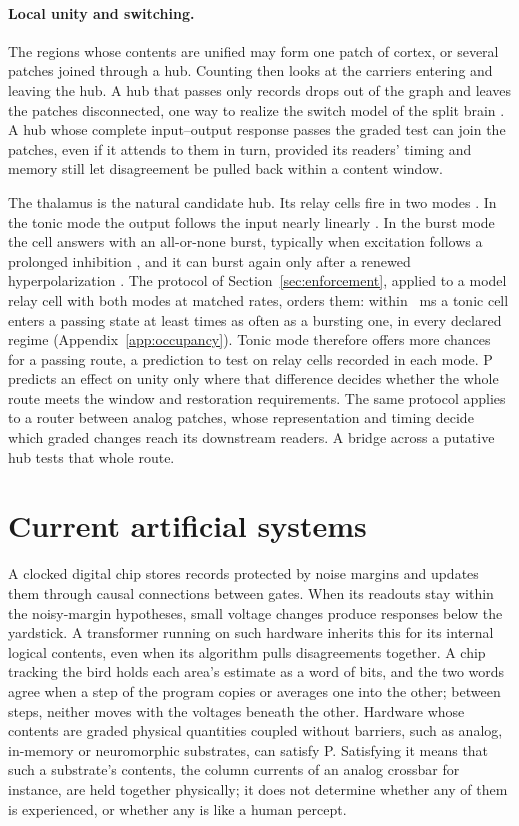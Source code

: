 \documentclass[12pt]{article}
\begin{document}
\paragraph{Local unity and switching.} The regions whose contents are unified
may form one patch of cortex, or several patches joined through a hub. Counting
then looks at the carriers entering and leaving the hub. A hub that passes only
records drops out of the graph and leaves the patches disconnected, one way to
realize the switch model of the split brain \citep{bayne2010}. A hub whose
complete input--output response passes the graded test can join the patches,
even if it attends to them in turn, provided its readers' timing and memory
still let disagreement be pulled back within a content window.

The thalamus is the natural candidate hub. Its relay cells fire in two modes
\citep{sherman2001}. In the tonic mode the output follows the input nearly
linearly \citep{lesica2004}. In the burst mode the cell answers with an
all-or-none burst, typically when excitation follows a prolonged inhibition
\citep{lesica2004}, and it can burst again only after a renewed hyperpolarization
\citep{sherman2001}. The protocol of Section~\ref{sec:enforcement}, applied to a
model relay cell with both modes \citep{smith2000} at matched rates, orders
them: within \uOccContentLongMs{}~ms a tonic cell enters a passing state at least
\uRlHitRatioMin{} times as often as a bursting one, in every declared regime
(Appendix~\ref{app:occupancy}). Tonic mode therefore offers more chances for a
passing route, a prediction to test on relay cells recorded in each mode. P
predicts an effect on unity only where that difference decides whether the
whole route meets the window and restoration requirements. The same protocol
applies to a router between analog patches, whose representation and timing
decide which graded changes reach its downstream readers. A bridge across a
putative hub tests that whole route.

\section{Current artificial systems}
\label{sec:ai}

A clocked digital chip stores records protected by noise margins and
updates them through causal connections between gates. When its readouts stay
within the noisy-margin hypotheses, small voltage changes produce responses
below the yardstick. A transformer running on such hardware inherits this for
its internal logical contents, even when its algorithm pulls disagreements
together. A chip tracking the bird holds each
area's estimate as a word of bits, and the two words agree when a step of the
program copies or averages one into the other; between steps, neither moves with
the voltages beneath the other. Hardware whose contents are graded physical
quantities coupled without barriers, such as analog, in-memory or neuromorphic
substrates, can satisfy P. Satisfying it means that such a substrate's contents,
the column currents of an analog crossbar for instance, are held together
physically; it does not determine whether any of them is experienced, or whether
any is like a human percept.
\end{document}
